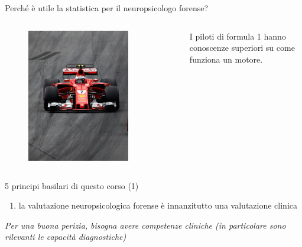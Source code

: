 \documentclass[
  ignorenonframetext,
]{beamer}
\providecommand{\tightlist}{%
  \setlength{\itemsep}{0pt}\setlength{\parskip}{0pt}}
\begin{document}
\begin{frame}{Perché è utile la statistica per il neuropsicologo
forense?}
\begin{columns}
\begin{figure}
\includegraphics[width=0.8\textwidth]{Figures/F1.png}
\end{figure}
\tiny{I piloti di formula 1 hanno conoscenze superiori su come funziona un motore.}

\end{columns}
\end{frame}

\begin{frame}{5 principi basilari di questo corso (1)}
\label{principi-basilari-di-questo-corso-1}
\begin{enumerate}
\tightlist
\item
  la valutazione neuropsicologica forense è innanzitutto una valutazione
  clinica
\end{enumerate}

\vspace{3em}

\emph{Per una buona perizia, bisogna avere competenze cliniche (in
particolare sono rilevanti le capacità diagnostiche)}
\end{frame}
\end{document}
